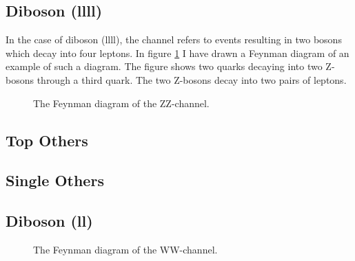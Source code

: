 \subsection{Diboson (llll)}
In the case of diboson (llll), the channel refers to events resulting in two bosons which decay 
into four leptons. In figure \ref{fig:zz} I have drawn a Feynman diagram of an example of 
such a diagram. The figure shows two quarks decaying into two Z-bosons through a third quark.
The two Z-bosons decay into two pairs of leptons. 
\begin{figure}
    \centering
    \caption{The Feynman diagram of the ZZ-channel.}
    \label{fig:zz}
\end{figure}



\subsection{Top Others}
\subsection{Single Others}
\subsection{Diboson (ll)}
\begin{figure}
    \centering
    \caption{The Feynman diagram of the WW-channel.}
    \label{fig:ww}
\end{figure}
